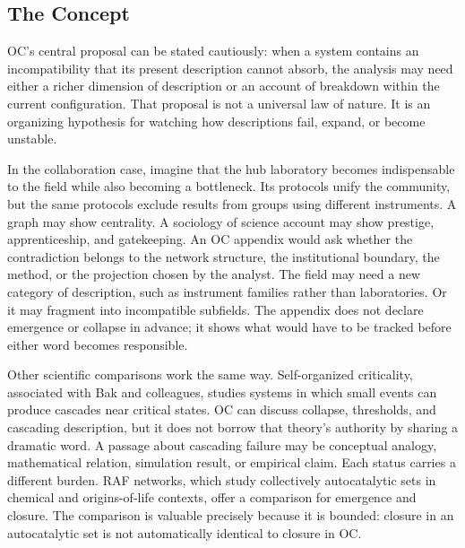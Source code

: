 \documentclass[11pt,a4paper,openany]{book}
\begin{document}
\subsection{The Concept}
OC's central proposal can be stated cautiously: when a system contains an incompatibility that its present description cannot absorb, the analysis may need either a richer dimension of description or an account of breakdown within the current configuration. That proposal is not a universal law of nature. It is an organizing hypothesis for watching how descriptions fail, expand, or become unstable. \cite{raf_networks,bak_soc}\par
In the collaboration case, imagine that the hub laboratory becomes indispensable to the field while also becoming a bottleneck. Its protocols unify the community, but the same protocols exclude results from groups using different instruments. A graph may show centrality. A sociology of science account may show prestige, apprenticeship, and gatekeeping. An OC appendix would ask whether the contradiction belongs to the network structure, the institutional boundary, the method, or the projection chosen by the analyst. The field may need a new category of description, such as instrument families rather than laboratories. Or it may fragment into incompatible subfields. The appendix does not declare emergence or collapse in advance; it shows what would have to be tracked before either word becomes responsible.\par
Other scientific comparisons work the same way. Self-organized criticality, associated with Bak and colleagues, studies systems in which small events can produce cascades near critical states. OC can discuss collapse, thresholds, and cascading description, but it does not borrow that theory's authority by sharing a dramatic word. A passage about cascading failure may be conceptual analogy, mathematical relation, simulation result, or empirical claim. Each status carries a different burden. RAF networks, which study collectively autocatalytic sets in chemical and origins-of-life contexts, offer a comparison for emergence and closure. The comparison is valuable precisely because it is bounded: closure in an autocatalytic set is not automatically identical to closure in OC.\par
\end{document}
